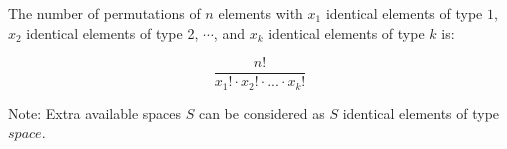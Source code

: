 \vspace{1em}
\sffamily
\bgroup

The number of permutations of $n$ elements with $x_1$ identical elements of type $1$,
$x_2$ identical elements of type 2, $\cdots$, and $x_k$ identical elements of type $k$ is:

$$\frac{n!}{x_1! \cdot x_2! \cdot ... \cdot x_k!}$$

Note: Extra available spaces $S$ can be considered as $S$ identical elements of type $space$.

\egroup
\vspace{1em}